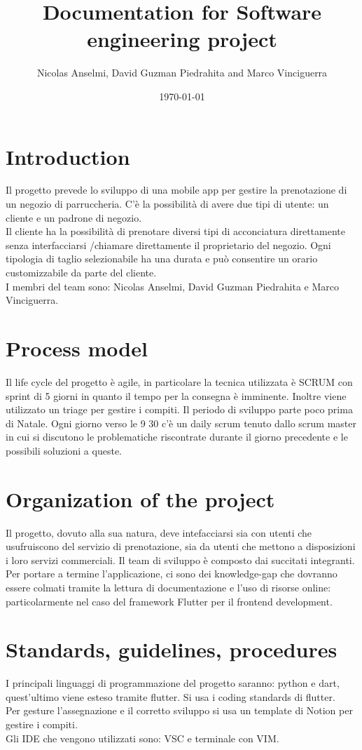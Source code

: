 \documentclass{article}
\title{Documentation for Software engineering project}
\author{Nicolas Anselmi, David Guzman Piedrahita and Marco Vinciguerra}
\date{\today}
\begin{document}
\maketitle

\section{Introduction}
Il progetto prevede lo sviluppo di una mobile app per gestire la prenotazione di 
un negozio di parruccheria. C'è la possibilità di avere due tipi di utente:
un cliente e un padrone di negozio.\\
Il cliente ha la possibilità di prenotare diversi 
tipi di acconciatura direttamente senza interfacciarsi /chiamare direttamente il proprietario
del negozio. Ogni tipologia di taglio selezionabile ha una durata e può consentire un orario customizzabile 
da parte del cliente. \\ 
I membri del team sono: Nicolas Anselmi, David Guzman Piedrahita e Marco Vinciguerra.

\section{Process model}
Il life cycle del progetto è agile, in particolare la tecnica utilizzata è SCRUM con
sprint di 5 giorni in quanto il tempo per la consegna è imminente. Inoltre viene utilizzato un triage per
gestire i compiti.
Il periodo di sviluppo parte poco prima di Natale. Ogni giorno verso le 9 30 
c'è un daily scrum tenuto dallo scrum master in cui si discutono le problematiche riscontrate durante 
il giorno precedente e le possibili soluzioni a queste.

\section{Organization of the project}
Il progetto, dovuto alla sua natura, deve intefacciarsi sia con utenti  che usufruiscono del servizio di prenotazione, sia da utenti che mettono a disposizioni i loro servizi commerciali.
Il team di sviluppo è composto dai succitati integranti. Per portare a termine l'applicazione, ci sono dei knowledge-gap che dovranno essere colmati tramite la lettura di documentazione e l'uso di risorse online: particolarmente nel caso del framework Flutter per il frontend development.

\section{Standards, guidelines, procedures}
I principali linguaggi di programmazione del progetto saranno: python e dart, quest'ultimo
viene esteso tramite flutter.
Si usa i coding standards di flutter.
\\Per gesture l'assegnazione e il corretto sviluppo si usa un template di Notion per gestire i compiti.
\\Gli IDE che vengono utilizzati sono: VSC e terminale con VIM.
\end{document}
